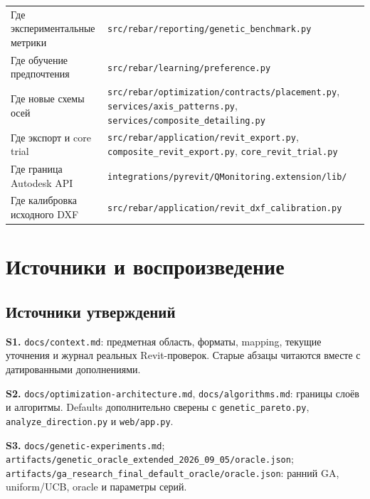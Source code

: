 \documentclass[11pt,a4paper]{article}
\begin{document}
{\begin{longtable}{@{}L{54.804mm}L{106.384mm}@{}}
Где экспериментальные метрики & {\small\nolinkurl{src/rebar/reporting/genetic_benchmark.py}} \\
Где обучение предпочтения & {\small\nolinkurl{src/rebar/learning/preference.py}} \\
Где новые схемы осей & {\small\nolinkurl{src/rebar/optimization/contracts/placement.py}}, {\small\nolinkurl{services/axis_patterns.py}}, {\small\nolinkurl{services/composite_detailing.py}} \\
Где экспорт и core trial & {\small\nolinkurl{src/rebar/application/revit_export.py}}, {\small\nolinkurl{composite_revit_export.py}}, {\small\nolinkurl{core_revit_trial.py}} \\
Где граница Autodesk API & {\small\nolinkurl{integrations/pyrevit/QMonitoring.extension/lib/}} \\
Где калибровка исходного DXF & {\small\nolinkurl{src/rebar/application/revit_dxf_calibration.py}} \\
\end{longtable}}

\section{Источники и воспроизведение}

\subsection{Источники утверждений}

\hypertarget{S1}{}

\textbf{S1.} {\small\nolinkurl{docs/context.md}}: предметная область, форматы, mapping, текущие уточнения и журнал реальных Revit-проверок. Старые абзацы читаются вместе с датированными дополнениями.


\hypertarget{S2}{}

\textbf{S2.} {\small\nolinkurl{docs/optimization-architecture.md}}, {\small\nolinkurl{docs/algorithms.md}}: границы слоёв и алгоритмы. Defaults дополнительно сверены с {\small\nolinkurl{genetic_pareto.py}}, {\small\nolinkurl{analyze_direction.py}} и {\small\nolinkurl{web/app.py}}.


\hypertarget{S3}{}

\textbf{S3.} {\small\nolinkurl{docs/genetic-experiments.md}}; {\small\nolinkurl{artifacts/genetic_oracle_extended_2026_09_05/oracle.json}}; {\small\nolinkurl{artifacts/ga_research_final_default_oracle/oracle.json}}: ранний GA, uniform/UCB, oracle и параметры серий.
\end{document}
